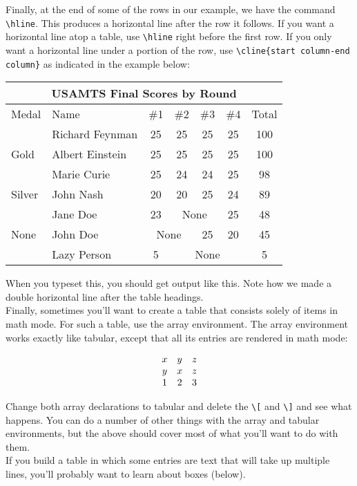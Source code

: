 Finally, at the end of some of the rows in our example, we have the command \verb+\hline+. This produces a horizontal line after the row it follows. If you want a horizontal line atop a table, use \verb+\hline+ right before the first row. If you only want a horizontal line under a portion of the row, use \verb+\cline{start column-end column}+ as indicated in the example below:\\

\begin{tabular}[t]{|l|l|cccc|c|}\hline
\multicolumn{7}{|c|}{USAMTS Final Scores by Round}\\\hline
Medal&Name&\#1&\#2&\#3&\#4&Total\\\hline\hline
&Richard Feynman&25&25&25&25&100\\\cline{3-7}
Gold&Albert Einstein&25&25&25&25&100\\\cline{3-7}
&Marie Curie&25&24&24&25&98\\\hline
Silver&John Nash&20&20&25&24&89\\\hline
&Jane Doe&23&\multicolumn{2}{c}{None}&25&48\\\cline{3-7}
None&John Doe&\multicolumn{2}{c}{None}&25&20&45\\\cline{3-7}
&Lazy Person&5&\multicolumn{3}{c|}{None}&5\\\hline
\end{tabular}

When you typeset this, you should get output like this. Note how we made a double horizontal line after the table headings.\\

Finally, sometimes you'll want to create a table that consists solely of items in math mode. For such a table, use the array environment. The array environment works exactly like tabular, except that all its entries are rendered in math mode:

\[\begin{array}[b]{ccc}
x&y&z\\
y&x&z\\
1&2&3
\end{array}\]

Change both array declarations to tabular and delete the \verb+\[+ and \verb+\]+ and see what happens. You can do a number of other things with the array and tabular environments, but the above should cover most of what you'll want to do with them.\\

If you build a table in which some entries are text that will take up multiple lines, you'll probably want to learn about boxes (below).

